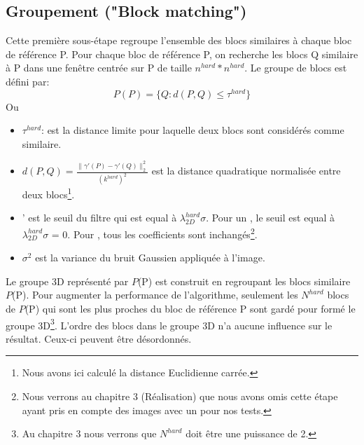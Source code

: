 \subsection{Groupement ("Block matching")}
Cette première sous-étape regroupe l'ensemble des blocs similaires à chaque bloc de référence P. Pour chaque bloc de référence P, on recherche les blocs Q similaire à P dans une fenêtre centrée sur P de taille \(n^{hard} * n^{hard}\). Le groupe de blocs est défini par: 
\begin{equation}
P(P) = \{Q: d(P,Q) \leq \tau^{hard}\}
\end{equation}
\newpage
Ou
\begin{itemize}
\item \( \tau^{hard} \): est la distance limite pour laquelle deux blocs sont considérés comme similaire.
\item \(d(P,Q) = \frac{\parallel \gamma' (P) - \gamma'(Q) \parallel_2^2}{(k^{hard})^2} \) est la distance quadratique normalisée entre deux blocs\footnote{Nous avons ici calculé la distance Euclidienne carrée.}.
\item \gamma' est le seuil du filtre qui est equal à \(\lambda^{hard}_{2D}\sigma \). Pour un \sigma {}, le seuil est equal à \(\lambda^{hard}_{2D}\sigma \) = 0. Pour \sigma {}, tous les coefficients sont inchangés\footnote{Nous verrons au chapitre 3 (Réalisation) que nous avons omis cette étape ayant pris en compte des images avec un \sigma {} pour nos tests.}.  
\item \(\sigma^2\) \: est la variance du bruit Gaussien appliquée à l'image.
\end{itemize}

Le groupe 3D représenté par \(P \)(P) est construit en regroupant les blocs similaire \(P \)(P). Pour augmenter la performance de l'algorithme, seulement les \(N^{hard} \) blocs de \(P \)(P) qui sont les plus proches du bloc de référence P sont gardé pour formé le groupe 3D\footnote{Au chapitre 3 nous verrons que \(N^{hard} \) doit être une puissance de 2.}. L'ordre des blocs dans le groupe 3D n'a aucune influence sur le résultat. Ceux-ci peuvent être désordonnés. 
\newpage
